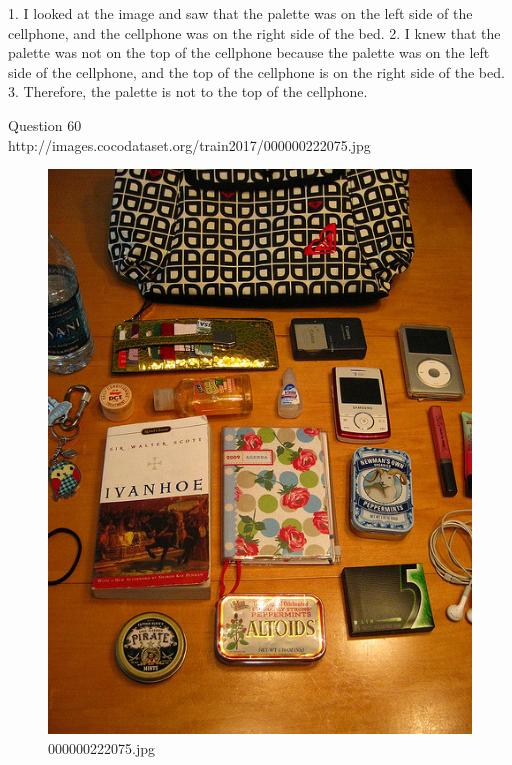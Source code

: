 \begin{enumerate}
    1. I looked at the image and saw that the palette was on the left side of the cellphone, and the cellphone was on the right side of the bed.
    2. I knew that the palette was not on the top of the cellphone because the palette was on the left side of the cellphone, and the top of the cellphone is on the right side of the bed.
    3. Therefore, the palette is not to the top of the cellphone.
\end{enumerate}
Question 60\\
http://images.cocodataset.org/train2017/000000222075.jpg
\begin{figure}[h]
    \centering
    \includegraphics[width=0.8\linewidth]{../image set/hard/000000222075.jpg}
    \caption{000000222075.jpg}
\end{figure}
